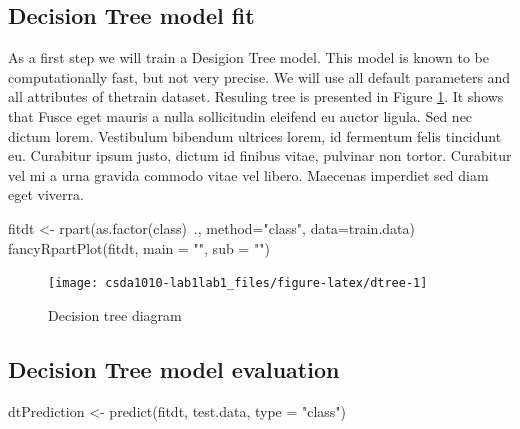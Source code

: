 \hypertarget{decision-tree-model-fit}{%
\subsection{Decision Tree model fit}\label{decision-tree-model-fit}}

As a first step we will train a Desigion Tree model. This model is known
to be computationally fast, but not very precise. We will use all
default parameters and all attributes of thetrain dataset. Resuling tree
is presented in Figure \ref{fig:dtree}. It shows that Fusce eget mauris
a nulla sollicitudin eleifend eu auctor ligula. Sed nec dictum lorem.
Vestibulum bibendum ultrices lorem, id fermentum felis tincidunt eu.
Curabitur ipsum justo, dictum id finibus vitae, pulvinar non tortor.
Curabitur vel mi a urna gravida commodo vitae vel libero. Maecenas
imperdiet sed diam eget viverra.

\begin{Schunk}
\begin{Sinput}
fitdt <- rpart(as.factor(class)~., method="class", data=train.data)
fancyRpartPlot(fitdt, main = "", sub = "")
\end{Sinput}
\begin{figure}

{\centering \texttt{[image: csda1010-lab1lab1\_files/figure-latex/dtree-1]} 

}

\caption[Decision tree diagram]{Decision tree diagram}\label{fig:dtree}
\end{figure}
\end{Schunk}

\hypertarget{decision-tree-model-evaluation}{%
\subsection{Decision Tree model
evaluation}\label{decision-tree-model-evaluation}}

\begin{Schunk}
\begin{Sinput}
dtPrediction <- predict(fitdt, test.data, type = "class")
\end{Sinput}
\end{Schunk}

